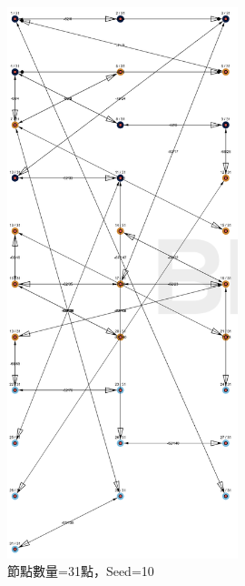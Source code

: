 \begin{ZhChapter}
\begin{figure}[H]
    \centering
    \includegraphics[width = 0.6\textwidth]{image/模擬實驗31點seed=10.png}
    \caption{節點數量=31點，Seed=10}
    \label{fig: 模擬實驗31點seed=10}
\end{figure}


\end{ZhChapter}
